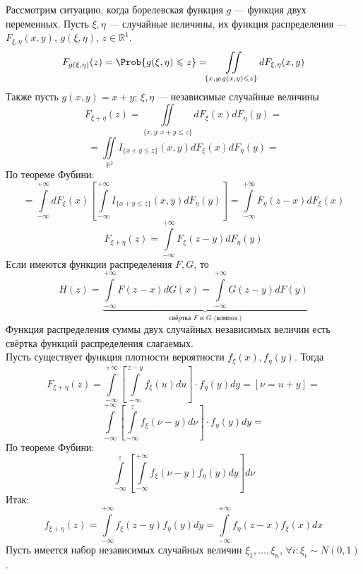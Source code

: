 Рассмотрим ситуацию, когда борелевская функция $g$ --- функция двух переменных. Пусть $\xi, \eta$ --- случайные величины, их функция распределения --- $F_{\xi, \eta} (x, y)$, $g(\xi, \eta)$, $z \in \mathbb{R}^1$.
	\[
		F_{g(\xi, \eta)} (z) = \Prob \{ g(\xi, \eta) \leqslant z \} = \iint\limits_{\{ x, y : g(x, y) \leqslant z \}} d F_{\xi, \eta} (x, y)
	\]
	Также пусть $g(x, y) = x + y$; $\xi, \eta$ --- независимые случайные величины
	\[
		F_{\xi + \eta} (z) = \iint\limits_{\{ x, y : x + y \leqslant z \}} dF_{\xi} (x) dF_{\eta} (y) =
	\]
	\[
		= \iint\limits_{\mathbb{R}^2} I_{\{ x + y \leqslant z \}} (x, y) dF_{\xi} (x) dF_{\eta} (y) =
	\]
	По теореме Фубини:
	\[
		= \int\limits_{-\infty}^{+\infty} dF_{\xi} (x) \left[ \int\limits_{-\infty}^{+\infty} I_{\{ x + y \leqslant z \}} (x, y) dF_{\eta} (y) \right] = \int\limits_{-\infty}^{+\infty} F_{\eta} (z-x) dF_{\xi} (x)
	\]
	\[
		F_{\xi + \eta} (z) = \int\limits_{-\infty}^{+\infty} F_{\xi} (z - y) dF_{\eta} (y)
	\]
	Если имеются функции распределения $F, G$, то
	\[
		H (z) = \underbrace{\int\limits_{-\infty}^{+\infty} F(z-x) dG(x) = \int\limits_{-\infty}^{+\infty} G(z - y) dF(y)}_{\text{свёртка $F$ и $G$ (композ.)}}
	\]
	Функция распределения суммы двух случайных независимых величин есть свёртка функций распределения слагаемых. \\
Пусть существует функция плотности вероятности $f_{\xi} (x), f_{\eta} (y)$. Тогда
\[
	F_{\xi + \eta} (z) = \int\limits_{-\infty}^{+\infty} \left[ \int\limits_{-\infty}^{z-y} f_{\xi} (u) du \right] \cdot f_{\eta} (y) dy = [\nu = u + y] =
\]
\[
	\int\limits_{-\infty}^{+\infty} \left[ \int\limits_{-\infty}^{z} f_{\xi} (\nu - y)d\nu \right] \cdot f_{\eta} (y) dy =
\]
По теореме Фубини:
\[
	\int\limits_{-\infty}^{z} \left[ \int\limits_{-\infty}^{+\infty} f_{\xi} (\nu - y) f_{\eta} (y) dy \right] d\nu
\]
Итак:
\[
	f_{\xi + \eta} (z) = \int\limits_{-\infty}^{+\infty} f_{\xi} (z - y) f_{\eta} (y) dy = \int\limits_{-\infty}^{+\infty} f_{\eta} (z - x) f_{\xi} (x) dx
\]
Пусть имеется набор независимых случайных величин $\xi_1, \ldots, \xi_n$, $\forall i : \xi_i \sim N (0,1)$. \\

